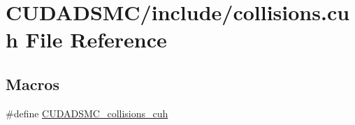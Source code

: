 \hypertarget{collisions_8cuh}{\section{C\+U\+D\+A\+D\+S\+M\+C/include/collisions.cuh File Reference}
\label{collisions_8cuh}
}
\subsection*{Macros}
\begin{DoxyCompactItemize}
\item 
\#define \hyperlink{collisions_8cuh_ab4c77f199ade636b07ef359166ed4642}{C\+U\+D\+A\+D\+S\+M\+C\+\_\+collisions\+\_\+cuh}
\end{DoxyCompactItemize}
